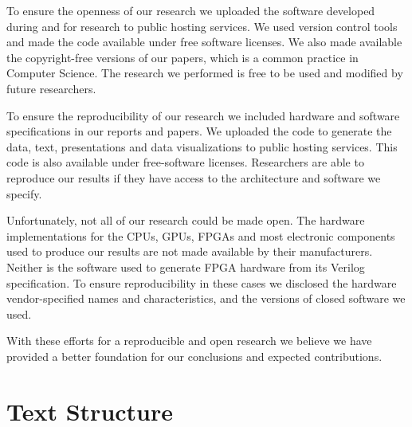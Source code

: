 To ensure the openness of our research we uploaded the software developed
during and for research to public hosting services. We used version control
tools and made the code available under free software licenses. We also
made available the copyright-free versions of our papers, which is a common
practice in Computer Science. The research we performed is free to be used and
modified by future researchers.

To ensure the reproducibility of our research we included hardware and software
specifications in our reports and papers. We uploaded the code to generate the
data, text, presentations and data visualizations to public hosting services.
This code is also available under free-software licenses. Researchers are able
to reproduce our results if they have access to the architecture and software
we specify.

Unfortunately, not all of our research could be made open. The hardware
implementations for the CPUs, GPUs, FPGAs and most electronic components used
to produce our results are not made available by their manufacturers. Neither
is the software used to generate FPGA hardware from its Verilog specification.
To ensure reproducibility in these cases we disclosed the hardware
vendor-specified names and characteristics, and the versions of closed software
we used.

With these efforts for a reproducible and open research we believe we have
provided a better foundation for our conclusions and expected contributions.

\section{Text Structure}
\label{sec:org}

